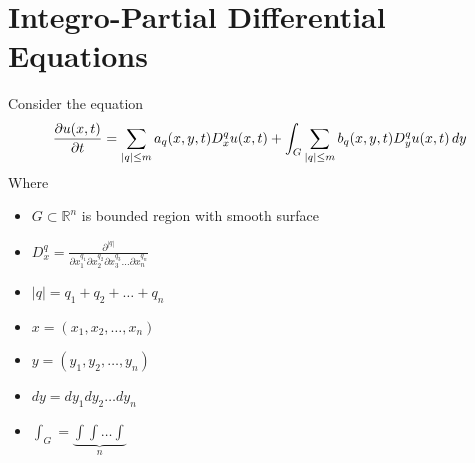 \section{Integro-Partial Differential Equations}
Consider the equation
\begin{equation*}
    \pdv{u(x,t)}{t} = \sum_{|q|\leq m} a_q(x,y,t) D_{x}^{q} u(x,t) + \int_G \sum_{|q|\leq m} b_q(x,y,t) D_{y}^{q} u(x,t) \, dy
\end{equation*}
Where
\begin{itemize}
        \item $G \subset \mathbb{R}^n$ is bounded region with smooth surface
        \item $D_{x}^{q} = \displaystyle \frac{\partial^{|q|}}{\partial x_{1}^{q_1}\partial x_{2}^{q_2}\partial x_{3}^{q_3}\dots \partial x_{n}^{q_n}} $
        \item $|q|=q_1 + q_2 + \dots + q_n$
        \item $x=(x_1,x_2,\dots, x_n)$
        \item $y=(y_1,y_2,\dots ,y_n)$
        \item $dy = dy_1 dy_2 \dots dy_n$
        \item $\int_G = \underbrace{\int\int \dots \int}_{\textit{n}}$
\end{itemize}
